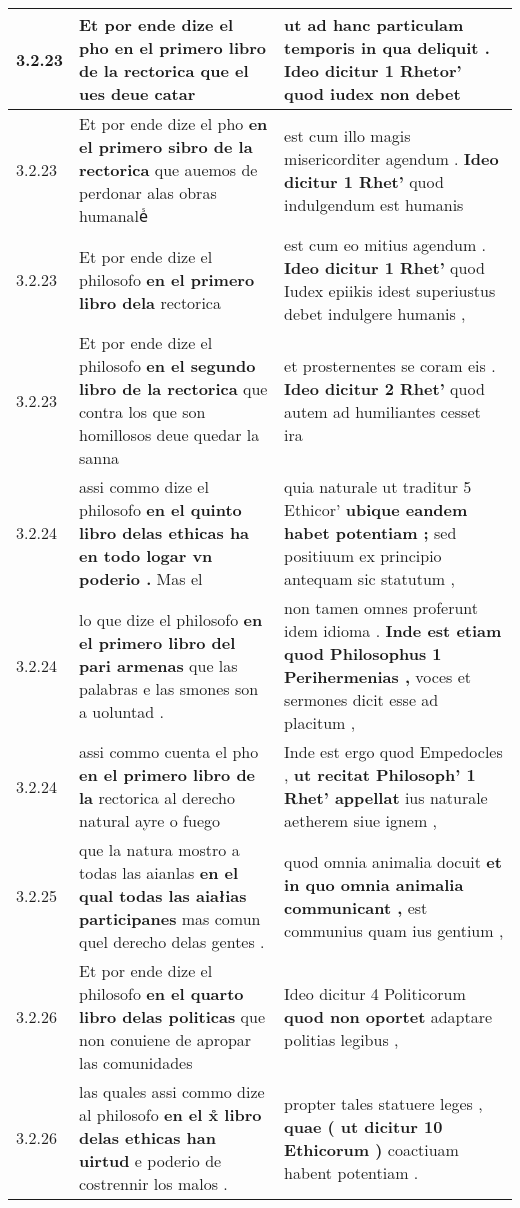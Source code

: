 \begin{tabular}{|p{1cm}|p{6.5cm}|p{6.5cm}|}
3.2.23 & Et por ende dize el pho \textbf{ en el primero libro de la rectorica } que el ues deue catar & ut ad hanc particulam temporis in qua deliquit . \textbf{ Ideo dicitur 1 Rhetor’ } quod iudex non debet \\\hline
3.2.23 & Et por ende dize el pho \textbf{ en el primero sibro de la rectorica } que auemos de perdonar alas obras humanaleᷤ & est cum illo magis misericorditer agendum . \textbf{ Ideo dicitur 1 Rhet’ } quod indulgendum est humanis \\\hline
3.2.23 & Et por ende dize el philosofo \textbf{ en el primero libro dela } rectorica & est cum eo mitius agendum . \textbf{ Ideo dicitur 1 Rhet’ } quod Iudex epiikis idest superiustus debet indulgere humanis , \\\hline
3.2.23 & Et por ende dize el philosofo \textbf{ en el segundo libro de la rectorica } que contra los que son homillosos deue quedar la sanna & et prosternentes se coram eis . \textbf{ Ideo dicitur 2 Rhet’ } quod autem ad humiliantes cesset ira \\\hline
3.2.24 & assi commo dize el philosofo \textbf{ en el quinto libro delas ethicas ha en todo logar vn poderio . } Mas el & quia naturale ut traditur 5 Ethicor’ \textbf{ ubique eandem habet potentiam ; } sed positiuum ex principio antequam sic statutum , \\\hline
3.2.24 & lo que dize el philosofo \textbf{ en el primero libro del pari armenas } que las palabras e las smones son a uoluntad . & non tamen omnes proferunt idem idioma . \textbf{ Inde est etiam quod Philosophus 1 Perihermenias , } voces et sermones dicit esse ad placitum , \\\hline
3.2.24 & assi commo cuenta el pho \textbf{ en el primero libro de la } rectorica al derecho natural ayre o fuego & Inde est ergo quod Empedocles , \textbf{ ut recitat Philosoph’ 1 Rhet’ appellat } ius naturale aetherem siue ignem , \\\hline
3.2.25 & que la natura mostro a todas las aianlas \textbf{ en el qual todas las aiałias participanes } mas comun quel derecho delas gentes . & quod omnia animalia docuit \textbf{ et in quo omnia animalia communicant , } est communius quam ius gentium , \\\hline
3.2.26 & Et por ende dize el philosofo \textbf{ en el quarto libro delas politicas } que non conuiene de apropar las comunidades & Ideo dicitur 4 Politicorum \textbf{ quod non oportet } adaptare politias legibus , \\\hline
3.2.26 & las quales assi commo dize al philosofo \textbf{ en el x̊ libro delas ethicas han uirtud } e poderio de costrennir los malos . & propter tales statuere leges , \textbf{ quae ( ut dicitur 10 Ethicorum ) } coactiuam habent potentiam . \\\hline

\end{tabular}

